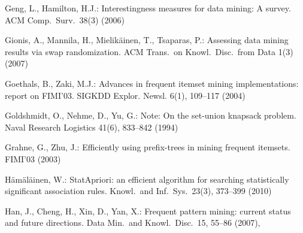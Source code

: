 \begin{thebibliography}{33}
Geng, L., Hamilton, H.J.: Interestingness measures for data mining: A survey.
\newblock ACM Comp.~Surv.~38(3) (2006)%

  \iffalse
\bibitem[{Geurts et~al.(2003)Geurts, Wets, Brijs, and Vanhoof}]{GeurtsWBV03}
Geurts, K., Wets, G., Brijs, T., Vanhoof, K.: Profiling of high-frequency
  accident locations by use of association rules.
\newblock Transp.~Res.~Rec.: J.~of the Transp.~Res.~Board 1840, 123--130 (2003)
\fi

Gionis, A., Mannila, H., Mielik\"{a}inen, T., Tsaparas, P.: Assessing data
  mining results via swap randomization.
\newblock ACM Trans.~on Knowl.~Disc.~from Data 1(3) (2007)%

Goethals, B., Zaki, M.J.: Advances in frequent itemset mining implementations:
  report on {FIMI'03}.
\newblock SIGKDD Explor. Newsl. 6(1), 109--117 (2004)%

Goldshmidt, O., Nehme, D., Yu, G.: Note: On the set-union knapsack problem.
\newblock Naval Research Logistics 41(6), 833--842 (1994)

Grahne, G., Zhu, J.: Efficiently using prefix-trees in mining frequent
  itemsets.
\newblock FIMI'03 (2003)

H{\"a}m{\"a}l{\"a}inen, W.: {StatApriori}: an efficient algorithm for searching
  statistically significant association rules.
\newblock Knowl.~and Inf.~Sys.~23(3), 373--399 (2010)

Han, J., Cheng, H., Xin, D., Yan, X.: Frequent pattern mining: current status
  and future directions.
\newblock Data Min.~and Knowl.~Disc.~15, 55--86 (2007),


\end{thebibliography}
